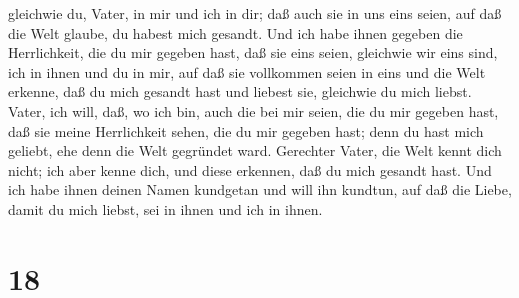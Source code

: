 gleichwie du, Vater, in mir und ich in dir; daß auch sie in uns eins
seien, auf daß die Welt glaube, du habest mich gesandt. 
Und ich habe ihnen gegeben die Herrlichkeit, die du mir gegeben hast,
daß sie eins seien, gleichwie wir eins sind,  ich in ihnen
und du in mir, auf daß sie vollkommen seien in eins und die Welt
erkenne, daß du mich gesandt hast und liebest sie, gleichwie du mich
liebst.  Vater, ich will, daß, wo ich bin, auch die bei mir
seien, die du mir gegeben hast, daß sie meine Herrlichkeit sehen, die du
mir gegeben hast; denn du hast mich geliebt, ehe denn die Welt gegründet
ward.  Gerechter Vater, die Welt kennt dich nicht; ich aber
kenne dich, und diese erkennen, daß du mich gesandt hast. 
Und ich habe ihnen deinen Namen kundgetan und will ihn kundtun, auf daß
die Liebe, damit du mich liebst, sei in ihnen und ich in ihnen.

\hypertarget{section-17}{%
\section{18}\label{section-17}}


